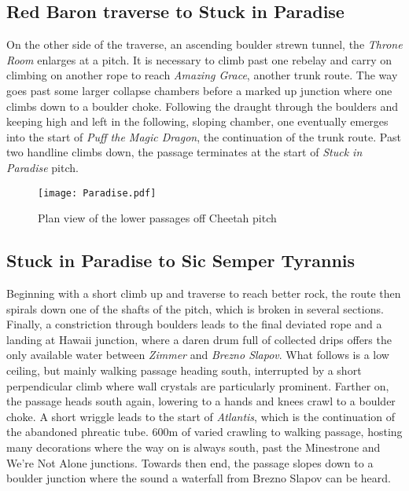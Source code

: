 \subsection{Red Baron traverse to Stuck in Paradise}
On the other side of the traverse, an ascending boulder strewn tunnel, the \emph{Throne Room} enlarges at a pitch. It is necessary to climb past one rebelay and carry on climbing on another rope to reach \emph{Amazing Grace}, another trunk route. The way goes past some larger collapse chambers before a marked up junction where one climbs down to a boulder choke. Following the draught through the boulders and keeping high and left in the following, sloping chamber, one eventually emerges into the start of \emph{Puff the Magic Dragon}, the continuation of the trunk route. Past two handline climbs down, the passage terminates at the start of \emph{Stuck in Paradise} pitch.

\begin{figure*}[t!]
\checkoddpage \ifoddpage \forcerectofloat \else \forceversofloat \fi
\centering
\texttt{[image: Paradise.pdf]}
\caption{Plan view of the lower passages off Cheetah pitch}
\label{paradise}
\end{figure*}

\subsection{Stuck in Paradise to Sic Semper Tyrannis}
Beginning with a short climb up and traverse to reach better rock, the route then spirals down one of the shafts of the pitch, which is broken in several sections. Finally, a constriction through boulders leads to the final deviated rope and a landing at Hawaii junction, where a daren drum full of collected drips offers the only available water between \emph{Zimmer} and \emph{Brezno Slapov}. What follows is a low ceiling, but mainly walking passage heading south, interrupted by a short perpendicular climb where wall crystals are particularly prominent. Farther on, the passage heads south again, lowering to a hands and knees crawl to a boulder choke. A short wriggle leads to the start of \emph{Atlantis}, which is the continuation of the abandoned phreatic tube. 600m of varied crawling to walking passage, hosting many decorations  where the way on is always south, past the Minestrone and We're Not Alone junctions. Towards then end, the passage slopes down to a boulder junction where the sound a waterfall from Brezno Slapov can be heard. 

